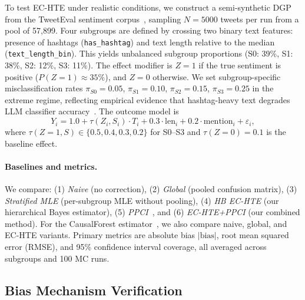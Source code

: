 To test EC-HTE under realistic conditions, we construct a semi-synthetic DGP from the TweetEval sentiment corpus~\cite{barbieri2020tweeteval}, sampling $N{=}5000$ tweets per run from a pool of 57{,}899.
Four subgroups are defined by crossing two binary text features: presence of hashtags (\texttt{has\_hashtag}) and text length relative to the median (\texttt{text\_length\_bin}).
This yields unbalanced subgroup proportions (S0: 39\%, S1: 38\%, S2: 12\%, S3: 11\%).
The effect modifier is $Z{=}1$ if the true sentiment is positive ($P(Z{=}1) \approx 35\%$), and $Z{=}0$ otherwise.
We set subgroup-specific misclassification rates $\pi_{S0}{=}0.05$, $\pi_{S1}{=}0.10$, $\pi_{S2}{=}0.15$, $\pi_{S3}{=}0.25$ in the extreme regime, reflecting empirical evidence that hashtag-heavy text degrades LLM classifier accuracy~\cite{ashwin2025bias}.
The outcome model is
\begin{equation}
Y_i = 1.0 + \tau(Z_i, S_i) \cdot T_i + 0.3 \cdot \text{len}_i + 0.2 \cdot \text{mention}_i + \varepsilon_i,
\end{equation}
where $\tau(Z{=}1, S) \in \{0.5, 0.4, 0.3, 0.2\}$ for S0--S3 and $\tau(Z{=}0) = 0.1$ is the baseline effect.

\paragraph{Baselines and metrics.}
We compare: (1) \textit{Naive} (no correction), (2) \textit{Global} (pooled confusion matrix), (3) \textit{Stratified MLE} (per-subgroup MLE without pooling), (4) \textit{HB EC-HTE} (our hierarchical Bayes estimator), (5) \textit{PPCI}~\cite{angelopoulos2023ppi}, and (6) \textit{EC-HTE+PPCI} (our combined method).
For the CausalForest estimator~\cite{wager2018causal}, we also compare naive, global, and EC-HTE variants.
Primary metrics are absolute bias $|\text{bias}|$, root mean squared error (RMSE), and 95\% confidence interval coverage, all averaged across subgroups and 100 MC runs.

\subsection{Bias Mechanism Verification}
\label{sec:bias_mechanism}

